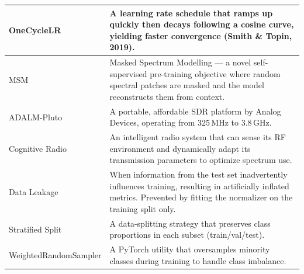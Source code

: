 \documentclass[12pt,a4paper]{article}
\begin{document}
\begin{longtable}{@{}p{3.2cm}p{10cm}@{}}
OneCycleLR & A learning rate schedule that ramps up quickly then decays following a cosine curve, yielding faster convergence (Smith \& Topin, 2019).\\\midrule
MSM & Masked Spectrum Modelling --- a novel self-supervised pre-training objective where random spectral patches are masked and the model reconstructs them from context.\\\midrule
ADALM-Pluto & A portable, affordable SDR platform by Analog Devices, operating from 325\,MHz to 3.8\,GHz.\\\midrule
Cognitive Radio & An intelligent radio system that can sense its RF environment and dynamically adapt its transmission parameters to optimize spectrum use.\\\midrule
Data Leakage & When information from the test set inadvertently influences training, resulting in artificially inflated metrics. Prevented by fitting the normalizer on the training split only.\\\midrule
Stratified Split & A data-splitting strategy that preserves class proportions in each subset (train/val/test).\\\midrule
WeightedRandom\-Sampler & A PyTorch utility that oversamples minority classes during training to handle class imbalance.\\
\bottomrule
\end{longtable}
\end{document}
